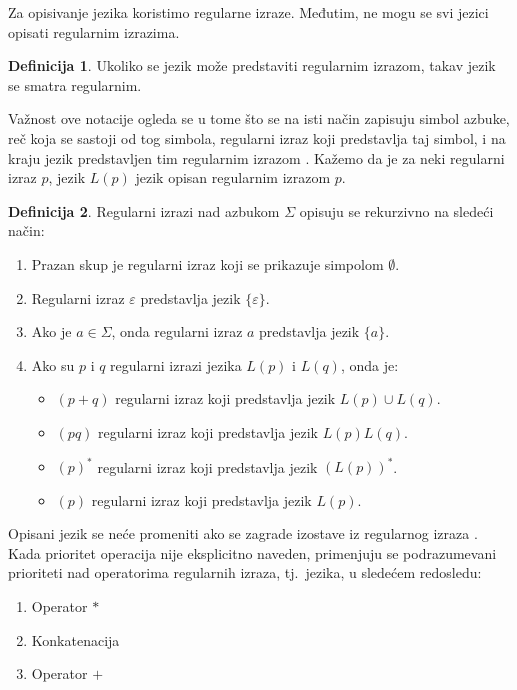 \documentclass[12pt,oneside]{memoir}
\theoremstyle{plain}
\theoremstyle{definition}
\newtheorem{defn}{Definicija} %
\begin{document}
Za opisivanje jezika koristimo regularne izraze. Međutim, ne mogu se svi jezici opisati regularnim izrazima. 

\begin{defn}
Ukoliko se jezik može predstaviti regularnim izrazom, takav jezik se smatra regularnim.
\end{defn}

Važnost ove notacije ogleda se u tome što se na isti način zapisuju simbol azbuke, reč koja se sastoji od tog simbola, regularni izraz koji predstavlja taj simbol, i na kraju jezik predstavljen tim regularnim izrazom \cite{Vitas}. Kažemo da je za neki regularni izraz $p$, jezik $L(p)$ jezik opisan regularnim izrazom $p$.

\begin{defn}
Regularni izrazi nad azbukom $\Sigma$ opisuju se rekurzivno na sledeći način:
\begin{enumerate}
\item Prazan skup je regularni izraz koji se prikazuje simpolom $\emptyset$.
\item Regularni izraz $\varepsilon$ predstavlja jezik $\{\varepsilon\}$.
\item Ako je $a \in \Sigma$, onda regularni izraz $a$ predstavlja jezik $\{a\}$.
\item Ako su $p$ i $q$ regularni izrazi jezika $L(p)$ i $L(q)$, onda je:
\begin{itemize}
\item $(p+q)$ regularni izraz koji predstavlja jezik $L(p) \cup L(q)$.
\item $(pq)$ regularni izraz koji predstavlja jezik $L(p)L(q)$.
\item $(p)^*$ regularni izraz koji predstavlja jezik $(L(p))^*$.
\item $(p)$ regularni izraz koji predstavlja jezik $L(p)$.
\end{itemize}
\end{enumerate}
\end{defn}

Opisani jezik se neće promeniti ako se zagrade izostave iz regularnog izraza \cite{Vitas}. Kada prioritet operacija nije eksplicitno naveden, primenjuju se podrazumevani prioriteti nad operatorima regularnih izraza, tj.~jezika, u sledećem redosledu:
\begin{enumerate}
	\item Operator $*$
	\item Konkatenacija
	\item Operator $+$
\end{enumerate}
\end{document}
